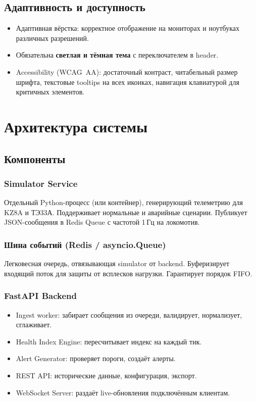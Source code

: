 \documentclass[12pt,a4paper]{article}
\begin{document}
\subsection{Адаптивность и доступность}

\begin{itemize}[nosep]
  \item Адаптивная вёрстка: корректное отображение на мониторах и ноутбуках различных разрешений.
  \item Обязательна \textbf{светлая и тёмная тема} с переключателем в header.
  \item Accessibility (WCAG~AA): достаточный контраст, читабельный размер шрифта, текстовые tooltips на всех иконках, навигация клавиатурой для критичных элементов.
\end{itemize}


\section{Архитектура системы}

\subsection{Компоненты}

\subsubsection*{Simulator Service}
Отдельный Python-процесс (или контейнер), генерирующий телеметрию для KZ8A и ТЭ33А. Поддерживает нормальные и аварийные сценарии. Публикует JSON-сообщения в Redis Queue с частотой 1\,Гц на локомотив.

\subsubsection*{Шина событий (Redis / asyncio.Queue)}
Легковесная очередь, отвязывающая simulator от backend. Буферизирует входящий поток для защиты от всплесков нагрузки. Гарантирует порядок FIFO.

\subsubsection*{FastAPI Backend}
\begin{itemize}[nosep]
  \item Ingest worker: забирает сообщения из очереди, валидирует, нормализует, сглаживает.
  \item Health Index Engine: пересчитывает индекс на каждый тик.
  \item Alert Generator: проверяет пороги, создаёт алерты.
  \item REST API: исторические данные, конфигурация, экспорт.
  \item WebSocket Server: раздаёт live-обновления подключённым клиентам.
\end{itemize}
\end{document}
